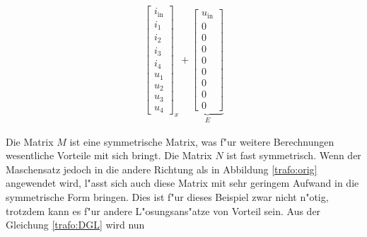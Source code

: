 \begin{refsection}
{\begin{align}
{\begin{bmatrix}
			i_\mathrm{in} \\
			i_1 \\
			i_2 \\
			i_3 \\
			i_4 \\
			u_1 \\
			u_2 \\
			u_3 \\
			u_4
			\end{bmatrix}}_{\text{$x$}}
			+
			\underbrace{\begin{bmatrix}
			u_\mathrm{in} \\
			0 \\
			0 \\
			0 \\
			0 \\
			0 \\
			0 \\
			0 \\
			0
			\end{bmatrix}}_{\text{$E$}}
			\label{trafo:DGL}
\end{align}
}
		


Die Matrix $M$ ist eine symmetrische Matrix, was f"ur weitere Berechnungen wesentliche Vorteile mit sich bringt. Die Matrix $N$ ist fast symmetrisch. Wenn der Maschensatz jedoch in die andere Richtung als in Abbildung \ref{trafo:orig} angewendet wird, l"asst sich auch diese Matrix mit sehr geringem Aufwand in die symmetrische Form bringen. Dies ist f"ur dieses Beispiel zwar nicht n"otig, trotzdem kann es f"ur andere L"osungsans"atze von Vorteil sein. Aus der Gleichung \ref{trafo:DGL} wird nun 


\end{refsection}
